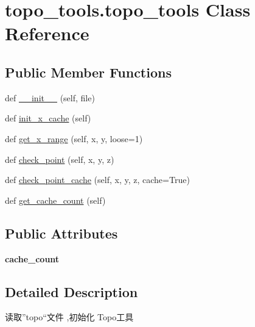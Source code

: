 \hypertarget{classtopo__tools_1_1topo__tools}{}\section{topo\+\_\+tools.\+topo\+\_\+tools Class Reference}
\label{classtopo__tools_1_1topo__tools}
\subsection*{Public Member Functions}
\begin{DoxyCompactItemize}
\item 
def \hyperlink{classtopo__tools_1_1topo__tools_ae18ef5271dc3172ab62129dedb2e8950}{\+\_\+\+\_\+init\+\_\+\+\_\+} (self, file)
\item 
def \hyperlink{classtopo__tools_1_1topo__tools_a250235e60a6317a7d24a2a6e62eaad18}{init\+\_\+x\+\_\+cache} (self)
\item 
def \hyperlink{classtopo__tools_1_1topo__tools_a539b10bdbc486db99350fb973840b516}{get\+\_\+x\+\_\+range} (self, x, y, loose=1)
\item 
def \hyperlink{classtopo__tools_1_1topo__tools_a71d64a3dbbbd261ecb63c4b435c07383}{check\+\_\+point} (self, x, y, z)
\item 
def \hyperlink{classtopo__tools_1_1topo__tools_a7331c454b277a899a176db176b3d4e62}{check\+\_\+point\+\_\+cache} (self, x, y, z, cache=True)
\item 
def \hyperlink{classtopo__tools_1_1topo__tools_a01655c25b44d883096a9f9b964003708}{get\+\_\+cache\+\_\+count} (self)
\end{DoxyCompactItemize}
\subsection*{Public Attributes}
\begin{DoxyCompactItemize}
\item 
\mbox{\label{classtopo__tools_1_1topo__tools_a06209159d9fcb4c585a6a4d2394377ed}} 
{\bfseries cache\+\_\+count}
\end{DoxyCompactItemize}


\subsection{Detailed Description}
\begin{DoxyVerb}读取”topo“文件 ,初始化 Topo工具
\end{DoxyVerb}
 

